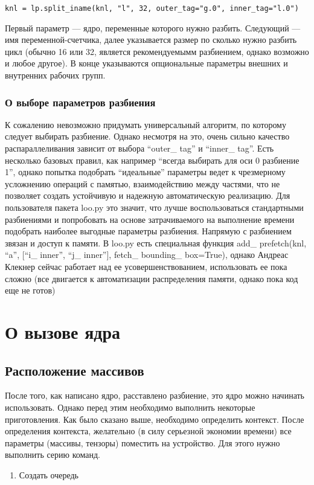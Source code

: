 \documentclass{scrartcl}
\begin{document}
\begin{verbatim}
knl = lp.split_iname(knl, "l", 32, outer_tag="g.0", inner_tag="l.0")
\end{verbatim}
Первый параметр --- ядро, переменные которого нужно разбить. Следующий --- имя
переменной-счетчика, далее указывается размер по сколько нужно разбить цикл
(обычно 16 или 32, является рекомендуемымм разбиением, однако возможно и любое
другое). В конце указываются опциональные параметры внешних и внутренних рабочих 
групп. 
\subsubsection{О выборе параметров разбиения}
\label{sec-7-5-1}

К сожалению невозможно придумать универсальный алгоритм, по которому следует 
выбирать разбиение. Однако несмотря на это, очень сильно качество распараллеливания
зависит от выбора ``outer\_{} tag'' и ``inner\_{} tag''. Есть несколько базовых правил,
как например ``всегда выбирать для оси 0 разбиение 1'', однако попытка подобрать 
``идеальные'' параметры ведет к чрезмерному усложнению операций с памятью, 
взаимодействию между частями, что не позволяет создать устойчивую и надежную
автоматическую реализацию. Для пользователя пакета loo.py это значит, что 
лучше воспользоваться стандартными разбиениями и попробовать на основе 
затрачиваемого на выполнение времени подобрать наиболее выгодные параметры
разбиения.
Напрямую с разбиением звязан и доступ к памяти. В loo.py есть специальная
функция add\_{} prefetch(knl, ``a'', [``i\_{} inner'', ``j\_{} inner''], fetch\_{} bounding\_{} box=True),
однако Андреас Клекнер сейчас работает над ее усовершенствованием, использовать 
ее пока сложно (все двигается к автоматизации распределения памяти, однако пока
код еще не готов) 
\section{О вызове ядра}
\label{sec-8}
\subsection{Расположение массивов}
\label{sec-8-1}

После того, как написано ядро, расставлено разбиение, это ядро можно начинать 
использовать. Однако перед этим необходимо выполнить некоторые приготовления.
Как было сказано выше, необходимо определить контекст. После определения контекста,
желательно (в силу серьезной экономии времени) все параметры (массивы, тензоры)
поместить на устройство. Для этого нужно выполнить серию команд.
\begin{enumerate}
\item Создать очередь
\end{enumerate}
\end{document}
